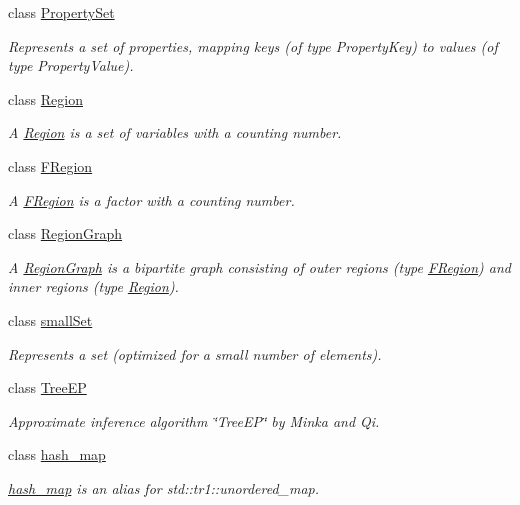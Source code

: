 \begin{CompactItemize}
class \hyperlink{classdai_1_1PropertySet}{PropertySet}
\begin{CompactList}\small\item\em Represents a set of properties, mapping keys (of type PropertyKey) to values (of type PropertyValue). \item\end{CompactList}\item 
class \hyperlink{classdai_1_1Region}{Region}
\begin{CompactList}\small\item\em A \hyperlink{classdai_1_1Region}{Region} is a set of variables with a counting number. \item\end{CompactList}\item 
class \hyperlink{classdai_1_1FRegion}{FRegion}
\begin{CompactList}\small\item\em A \hyperlink{classdai_1_1FRegion}{FRegion} is a factor with a counting number. \item\end{CompactList}\item 
class \hyperlink{classdai_1_1RegionGraph}{RegionGraph}
\begin{CompactList}\small\item\em A \hyperlink{classdai_1_1RegionGraph}{RegionGraph} is a bipartite graph consisting of outer regions (type \hyperlink{classdai_1_1FRegion}{FRegion}) and inner regions (type \hyperlink{classdai_1_1Region}{Region}). \item\end{CompactList}\item 
class \hyperlink{classdai_1_1smallSet}{smallSet}
\begin{CompactList}\small\item\em Represents a set (optimized for a small number of elements). \item\end{CompactList}\item 
class \hyperlink{classdai_1_1TreeEP}{TreeEP}
\begin{CompactList}\small\item\em Approximate inference algorithm \char`\"{}TreeEP\char`\"{} by Minka and Qi. \item\end{CompactList}\item 
class \hyperlink{classdai_1_1hash__map}{hash\_\-map}
\begin{CompactList}\small\item\em \hyperlink{classdai_1_1hash__map}{hash\_\-map} is an alias for std::tr1::unordered\_\-map. \item\end{CompactList}\item 

\end{CompactItemize}
